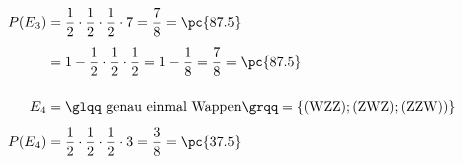 \begin{exercise}
\begin{equation*}
\begin{split}
        P(E_3)&=\frac{1}{2}\cdot\frac{1}{2}\cdot\frac{1}{2}\cdot7
        =\frac{7}{8}
        =\pc{87.5}
        \\[1ex]
        &=1-\frac{1}{2}\cdot\frac{1}{2}\cdot\frac{1}{2}
        =1-\frac{1}{8}
        =\frac{7}{8}
        =\pc{87.5}
        \\[3ex]
        E_4&=\text{\glqq genau einmal Wappen\grqq}
        =\{(\text{WZZ});(\text{ZWZ});(\text{ZZW}))\}
        \\[1ex]
        P(E_4)&=\frac{1}{2}\cdot\frac{1}{2}\cdot\frac{1}{2}\cdot3
        =\frac{3}{8}
        =\pc{37.5}
      \end{split}
    \end{equation*}
  \fi
\end{exercise}
